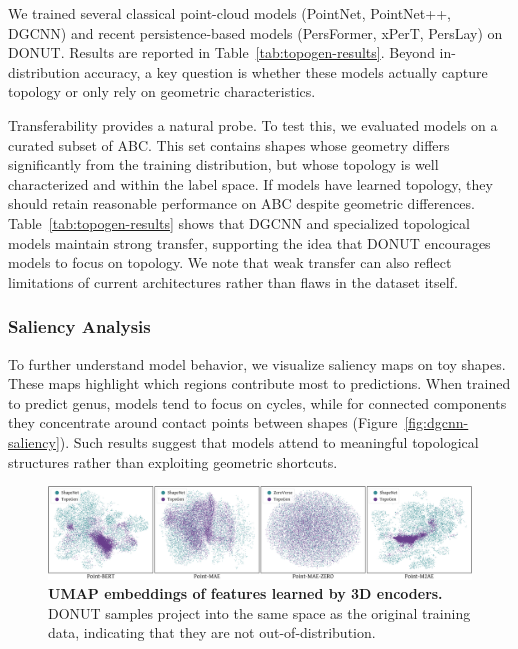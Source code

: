 We trained several classical point-cloud models (PointNet, PointNet++, DGCNN) and recent persistence-based models (PersFormer, xPerT, PersLay) on DONUT. Results are reported in Table~\ref{tab:topogen-results}. Beyond in-distribution accuracy, a key question is whether these models actually capture topology or only rely on geometric characteristics.

Transferability provides a natural probe. To test this, we evaluated models on a curated subset of ABC. This set contains shapes whose geometry differs significantly from the training distribution, but whose topology is well characterized and within the label space. If models have learned topology, they should retain reasonable performance on ABC despite geometric differences. Table~\ref{tab:topogen-results} shows that DGCNN and specialized topological models maintain strong transfer, supporting the idea that DONUT encourages models to focus on topology. We note that weak transfer can also reflect limitations of current architectures rather than flaws in the dataset itself.




\subsubsection{Saliency Analysis}
\label{sssec:topogen-saliency}

To further understand model behavior, we visualize saliency maps on toy shapes. These maps highlight which regions contribute most to predictions. When trained to predict genus, models tend to focus on cycles, while for connected components they concentrate around contact points between shapes (Figure~\ref{fig:dgcnn-saliency}). Such results suggest that models attend to meaningful topological structures rather than exploiting geometric shortcuts.

\begin{figure}[t]
  \centering
  \includegraphics[width=\linewidth]{figs/topogen/umaps_overview.pdf}
  \caption{\textbf{UMAP embeddings of features learned by 3D encoders.} DONUT samples project into the same space as the original training data, indicating that they are not out-of-distribution.}
  \label{fig:topogen-umaps-overview}
\end{figure}


